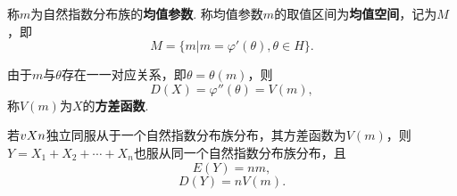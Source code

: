\begin{definition}
称\(m\)为自然指数分布族的\textbf{均值参数}.
称均值参数\(m\)的取值区间为\textbf{均值空间}，记为\(M\)，即\[
M = \{ m \vert m = \varphi'(\theta), \theta \in H \}.
\]

由于\(m\)与\(\theta\)存在一一对应关系，即\(\theta = \theta(m)\)，则\[
D(X) = \varphi''(\theta) = V(m),
\]称\(V(m)\)为\(X\)的\textbf{方差函数}.
\end{definition}

\begin{theorem}
若\(v{X}{n}\)独立同服从于一个自然指数分布族分布，其方差函数为\(V(m)\)，则\(Y=X_1+X_2+\dotsb+X_n\)也服从同一个自然指数分布族分布，且\[
E(Y)=n m,
\]\[
D(Y)=n V(m).
\]
\end{theorem}
